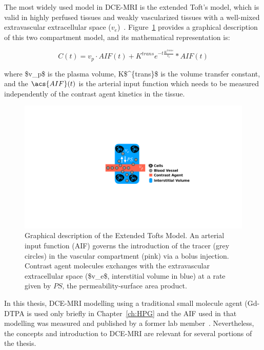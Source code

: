 The most widely used model in \acs{DCE-MRI} is the extended Toft's model, which is valid in highly perfused tissues and weakly vascularized tissues with a well-mixed extravascular extracellular space ($v_e$)~\cite{Sourbron:2013jz}.
Figure~\ref{XTofts} provides a graphical description of this two compartment model, and its mathematical representation is:

\begin{equation}
C(t) = v_p \cdot AIF(t) + K^{trans}e^{-t\frac{K^{trans}}{v_e}} * AIF(t)
\end{equation}

where \acs{$v_p$} is the plasma volume, \acs{K$^{trans}$} is the volume transfer constant, and the $\acs{AIF}(t)$ is the arterial input function which needs to be measured independently of the contrast agent kinetics in the tissue.

\begin{figure}[htbp]
   \centering
   \includegraphics[width=\textwidth]{intro/intro-images/XTofts.pdf}
   \caption[Extended Tofts Model]{Graphical description of the Extended Tofts Model. An arterial input function (\acs{AIF}) governs the introduction of the tracer (grey circles) in the vascular compartment (pink) via a bolus injection. Contrast agent molecules exchanges with the extravascular extracellular space (\acs{$v_e$}, interstitial volume in blue) at a rate given by $PS$, the permeability-surface area product.}
   \label{XTofts}
\end{figure}

In this thesis, \acs{DCE-MRI} modelling using a traditional small molecule agent (\acs{Gd-DTPA} is used only briefly in Chapter~\ref{ch:HPG} and the \acs{AIF} used in that modelling was measured and published by a former lab member~\cite{Moroz:2013ee}.
Nevertheless, the concepts and introduction to \acs{DCE-MRI} are relevant for several portions of the thesis. 

